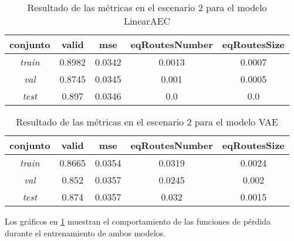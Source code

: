 \begin{table}[!h]
	\centering
	\caption{Resultado de las métricas en el escenario 2 para el modelo LinearAEC}
	\begin{tabular}{|c|c|c|c|c|}
		\hline
		\textbf{conjunto} & \textbf{ valid} & \textbf{mse} & \textbf{eqRoutesNumber} & \textbf{eqRoutesSize}  \\
		\hline
		\textit{train} & 0.8982 & 0.0342 & 0.0013 & 0.0007 \\
		\hline
		\textit{val} & 0.8745 & 0.0345 & 0.001 & 0.0005 \\
		\hline
		\textit{test} & 0.897 & 0.0346 & 0.0 & 0.0 \\
		\hline
		
	\end{tabular}
	\label{case2AEC}
\end{table}

\begin{table}[!h]
	\centering
	\caption{Resultado de las métricas en el escenario 2 para el modelo VAE}
	\begin{tabular}{|c|c|c|c|c|}
		\hline
		\textbf{conjunto} & \textbf{ valid} & \textbf{mse} & \textbf{eqRoutesNumber} & \textbf{eqRoutesSize}  \\
		\hline
		\textit{train} & 0.8665 & 0.0354 & 0.0319 & 0.0024 \\
		\hline
		\textit{val} & 0.852 & 0.0357 & 0.0245 & 0.002 \\
		\hline
		\textit{test} & 0.874 & 0.0357 & 0.032 & 0.0015 \\
		\hline
		
	\end{tabular}
	\label{case2VAE}
\end{table}

Los gráficos en \ref{loss_case2} muestran el comportamiento de las funciones de pérdida durante el entrenamiento de ambos modelos.

\begin{figure}[!h]
	\label{loss_case2}
\end{figure}



\begin{figure}[!h]
	\label{space_case2}
\end{figure}

